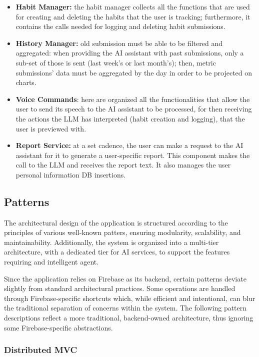 \documentclass{article}
\begin{document}
\begin{itemize}
	\item \textbf{Habit Manager:} the habit manager collects all the functions that are used for creating and deleting the habits that the user is tracking; furthermore, it contains the calls needed for logging and deleting habit submissions.
	\item \textbf{History Manager:} old submission must be able to be filtered and aggregated: when providing the AI assistant with past submissions, only a sub-set of those is sent (last week's or last month's); then, metric submissions' data must be aggregated by the day in order to be projected on charts.
	\item \textbf{Voice Commands}: here are organized all the functionalities that allow the user to send its speech to the AI assistant to be processed, for then receiving the actions the LLM has interpreted (habit creation and logging), that the user is previewed with.
	\item \textbf{Report Service:} at a set cadence, the user can make a request to the AI assistant for it to generate a user-specific report. This component makes the call to the LLM and receives the report text. It also manages the user personal information DB insertions.
\end{itemize}

\subsection{Patterns}

The architectural design of the application is structured according to the principles of various well-known patters, ensuring modularity, scalability, and maintainability.
Additionally, the system is organized into a multi-tier architecture, with a dedicated tier for AI services, to support the features requiring and intelligent agent.

Since the application relies on Firebase as its backend, certain patterns deviate slightly from standard architectural practices.
Some operations are handled through Firebase-specific shortcuts which, while efficient and intentional, can blur the traditional separation of concerns within the system.
The following pattern descriptions reflect a more traditional, backend-owned architecture, thus ignoring some Firebase-specific abstractions.

\subsubsection{Distributed MVC}
\end{document}
